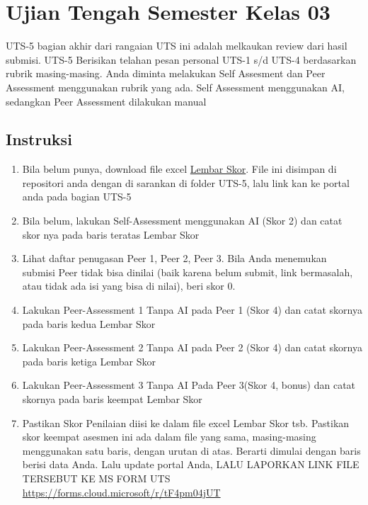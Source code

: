 \documentclass[
  letterpaper,
  DIV=11,
  numbers=noendperiod]{scrreprt}
\providecommand{\tightlist}{%
  \setlength{\itemsep}{0pt}\setlength{\parskip}{0pt}}
\begin{document}

\chapter*{Ujian Tengah Semester Kelas
03}\label{ujian-tengah-semester-kelas-03}


UTS-5 bagian akhir dari rangaian UTS ini adalah melkaukan review dari
hasil submisi. UTS-5 Berisikan telahan pesan personal UTS-1 s/d UTS-4
berdasarkan rubrik masing-masing. Anda diminta melakukan Self Assesment
dan Peer Assessment menggunakan rubrik yang ada. Self Assessment
menggunakan AI, sedangkan Peer Assessment dilakukan manual

\section*{Instruksi}\label{instruksi-1}


\begin{enumerate}
\def\labelenumi{\arabic{enumi}.}
\tightlist
\item
  Bila belum punya, download file excel
  \href{./asesmen/UTS-5_Skor.xlsx}{Lembar Skor}. File ini disimpan di
  repositori anda dengan di sarankan di folder UTS-5, lalu link kan ke
  portal anda pada bagian UTS-5
\item
  Bila belum, lakukan Self-Assessment menggunakan AI (Skor 2) dan catat
  skor nya pada baris teratas Lembar Skor
\item
  Lihat daftar penugasan Peer 1, Peer 2, Peer 3. Bila Anda menemukan
  submisi Peer tidak bisa dinilai (baik karena belum submit, link
  bermasalah, atau tidak ada isi yang bisa di nilai), beri skor 0.
\item
  Lakukan Peer-Assessment 1 Tanpa AI pada Peer 1 (Skor 4) dan catat
  skornya pada baris kedua Lembar Skor
\item
  Lakukan Peer-Assessment 2 Tanpa AI pada Peer 2 (Skor 4) dan catat
  skornya pada baris ketiga Lembar Skor
\item
  Lakukan Peer-Assessment 3 Tanpa AI Pada Peer 3(Skor 4, bonus) dan
  catat skornya pada baris keempat Lembar Skor
\item
  Pastikan Skor Penilaian diisi ke dalam file excel Lembar Skor tsb.
  Pastikan skor keempat asesmen ini ada dalam file yang sama,
  masing-masing menggunakan satu baris, dengan urutan di atas. Berarti
  dimulai dengan baris berisi data Anda. Lalu update portal Anda, LALU
  LAPORKAN LINK FILE TERSEBUT KE MS FORM UTS
  \url{https://forms.cloud.microsoft/r/tF4pm04jUT}
\end{enumerate}
\end{document}
